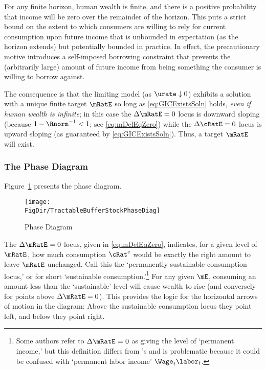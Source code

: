 \documentclass{\handout}
\begin{document}
For any finite horizon, human wealth is finite, and there is a positive probability that income will be zero over the remainder of the horizon.  This puts a strict bound on the extent to which consumers are willing to rely for current consumption upon future income that is unbounded in expectation (as the horizon extends) but potentially bounded in practice.  In effect, the precautionary motive introduces a self-imposed borrowing constraint that prevents the (arbitrarily large) amount of future income from being something the consumer is willing to borrow against.

The consequence is that the limiting model (as $\urate \downarrow 0$) exhibits a solution with a unique finite target $\mRatE$ so long as \eqref{eq:GICExistsSoln} holds, {\it even if human wealth is infinite}; in this case the $\dmEqZero$ locus is downward sloping (because $1-\Rnorm^{-1}<1$; see \eqref{eq:mDelEqZero}) while the $\dcEqZero$ locus is upward sloping (as guaranteed by \eqref{eq:GICExistsSoln}).  Thus, a target $\mRatE$ will exist.

\subsubsection{The Phase Diagram}

Figure~\ref{fig:PhaseDiag} presents the phase diagram.
\begin{figure}
\caption{Phase Diagram}\label{fig:PhaseDiag}
\texttt{[image: \\FigDir/TractableBufferStockPhaseDiag]}
\end{figure}


The $\Delta \mRatE_{\tSS} = 0$ locus, given in \eqref{eq:mDelEqZero}, indicates, for a given level of $\mRatE_{\tSS}$, how much consumption ${\cRat}^{e}_{\tSS}$ would be exactly the right amount to leave $\mRatE$ unchanged.  Call this the `permanently sustainable consumption locus,' or for short `sustainable consumption.'\footnote{Some authors refer to $\Delta \mRatE_{\tSS} = 0$ as giving the level of `permanent income,' but this definition differs from \cite{friedmanATheory}'s and is problematic because it could be confused with `permanent labor income' $\Wage_{t} \labor_{t}$.}  For any given $\mE$, consuming an amount less than the `sustainable' level will cause wealth to rise (and conversely for points above $\Delta \mRatE =0$).  This provides the logic for the horizontal arrows of motion in the diagram: Above the sustainable consumption locus they point left, and below they point right.
\end{document}
